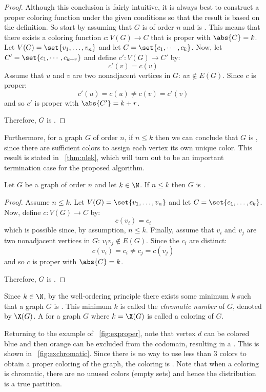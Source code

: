 \begin{proof}
  Although this conclusion is fairly intuitive, it is always best to construct a proper coloring function under the
  given conditions so that the result is based on the definition.  So start by assuming that \(G\) is of order
  \(n\) and is .  This means that there exists a coloring function \(c:V(G)\to C\) that is proper with
  \(\abs{C}=k\).  Let \(V(G)=\set{v_1,\ldots,v_n}\) and let \(C=\set{c_1,\cdots,c_k}\).  Now, let
  \(C'=\set{c_1,\cdots,c_{k+r}}\) and define \(c':V(G)\to C'\) by:
  \[c'(v)=c(v)\]
  Assume that \(u\) and \(v\) are two nonadjacent vertices in \(G\): \(uv\notin E(G)\).  Since \(c\) is proper:
  \[c'(u)=c(u)\ne c(v)=c'(v)\]
  and so \(c'\) is proper with \(\abs{C'}=k+r\).

  Therefore, \(G\) is .
\end{proof}

Furthermore, for a graph \(G\) of order \(n\), if \(n\le k\) then we can conclude that \(G\) is ,
since there are sufficient colors to assign each vertex its own unique color.  This result is stated in
\theoremname~\ref{thm:nlek}, which will turn out to be an important termination case for the proposed algorithm.

\begin{theorem}
  \label{thm:nlek}
  Let \(G\) be a graph of order \(n\) and let \(k\in\N\).  If \(n\le k\) then \(G\) is .
\end{theorem}

\begin{proof}
  Assume \(n\le k\).  Let \(V(G)=\set{v_1,\ldots,v_n}\) and let \(C=\set{c_1,\ldots,c_k}\).  Now, define
  \(c:V(G)\to C\) by:
  \[c(v_i)=c_i\]
  which is possible since, by assumption, \(n\le k\).  Finally, assume that \(v_i\) and \(v_j\) are two nonadjacent
  vertices in \(G\): \(v_iv_j\notin E(G)\).  Since the \(c_i\) are distinct:
  \[c(v_i)=c_i\ne c_j=c(v_j)\]
  and so \(c\) is proper with \(\abs{C}=k\).

  Therefore, \(G\) is .
\end{proof}

Since \(k\in\N\), by the well-ordering principle there exists some minimum \(k\) such that a graph \(G\) is
.  This minimum \(k\) is called the \emph{chromatic number} of \(G\), denoted by \(\X(G)\).  A
 for a graph \(G\) where \(k=\X(G)\) is called a \emph{} coloring of \(G\).

Returning to the example  of \figurename~\ref{fig:exproper}, note that vertex \(d\) can be colored blue
and then orange can be excluded from the codomain, resulting in a .  This is shown in
\figurename~\ref{fig:exchromatic}.  Since there is no way to use less than 3 colors to obtain a proper coloring of
the graph, the coloring is .  Note that when a coloring is chromatic, there are no unused colors
(empty sets) and hence the distribution is a true partition.

